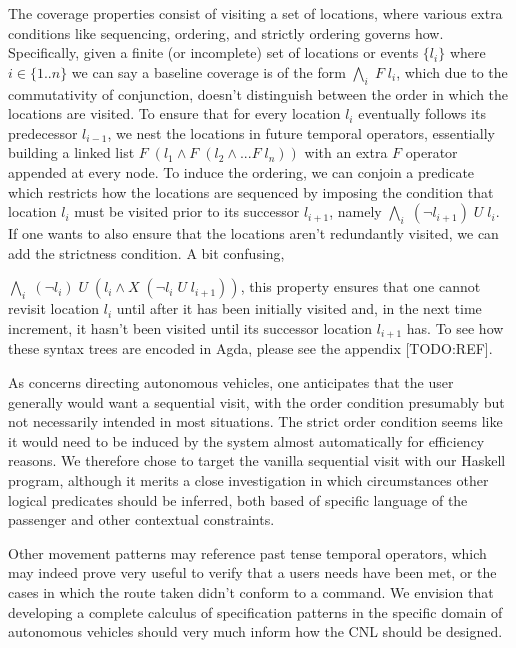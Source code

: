 \documentclass{article}
\begin{document}
The coverage properties consist of visiting a set of locations, where various
extra conditions like sequencing, ordering, and strictly ordering governs how.
Specifically, given a finite (or incomplete) set of locations or events $\{l_i\}$
where $i \in \{1..n\}$ we can say a baseline coverage is of the form
$\underset{i}{\bigwedge}\; F\; l_i$, which due to the commutativity of conjunction,
doesn't distinguish between the order in which the locations are visited. To
ensure that for every location $l_i$ eventually follows its predecessor $l_{i-1}$, we
nest the locations in future temporal operators, essentially building a linked
list $F\; (l_1 \wedge F\; (l_{2} \wedge ... F\; l_{n}))$ with an extra $F$
operator appended at every node. To induce the ordering, we can conjoin a predicate
which restricts how the locations are sequenced by imposing the condition that location
$l_{i}$ must be visited prior to its successor $l_{i+1}$, namely
$\underset{i}{\bigwedge}\; (\neg l_{i+1})\; U\; l_i$.
If one wants to also ensure that the locations aren't redundantly visited, we
can add the strictness condition. A bit confusing,

$\underset{i}{\bigwedge}\; (\neg l_{i})\; U\; (l_i \wedge X\; (\neg l_i\; U\;
l_{i+1}))$, this property ensures that one cannot revisit location $l_i$ until
after it has been initially visited and, in the next time increment, it hasn't
been visited until its successor location $l_{i+1}$ has. To see how these syntax
trees are encoded in Agda, please see the appendix [TODO:REF].

As concerns directing autonomous vehicles, one anticipates that the user
generally would want a sequential visit, with the order condition presumably but
not necessarily intended in most situations. The strict order condition seems
like it would need to be induced by the system almost automatically for
efficiency reasons. We therefore chose to target the vanilla sequential visit
with our Haskell program, although it merits a close investigation in which
circumstances other logical predicates should be inferred, both based of
specific language of the passenger and other contextual constraints.

Other movement patterns may reference past tense temporal operators, which may
indeed prove very useful to verify that a users needs have been met, or the
cases in which the route taken didn't conform to a command. We envision that
developing a complete calculus of specification patterns in the specific domain
of autonomous vehicles should very much inform how the CNL should be designed.
\end{document}

